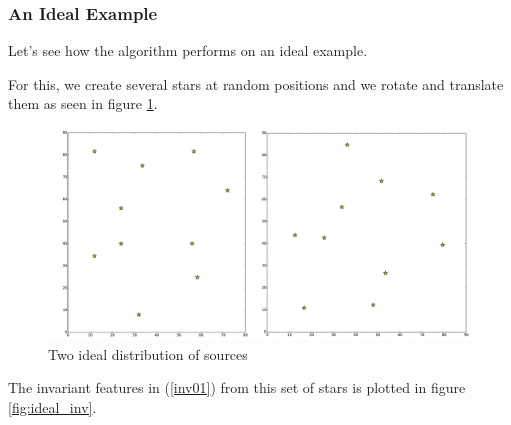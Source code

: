 



\subsubsection{An Ideal Example}

Let's see how the algorithm performs on an ideal example.

For this, we create several stars at random positions and we rotate and translate them as seen in figure \ref{fig:ideal_sources}.

\begin{figure}[htbp]
   \centering
   \includegraphics[width = \linewidth]{chapter_astroalign/figures/idealSources.pdf}
   \caption{Two ideal distribution of sources}
   \label{fig:ideal_sources}
\end{figure}

The invariant features in (\ref{inv01}) from this set of stars is plotted in figure \ref{fig:ideal_inv}.

